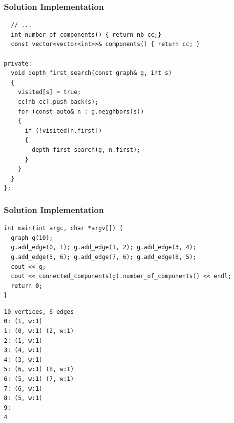 \documentclass{beamer}
\begin{document}
\begin{frame}[containsverbatim]
\frametitle{Solution Implementation}

\scriptsize
\begin{lstlisting}
  // ...
  int number_of_components() { return nb_cc;}
  const vector<vector<int>>& components() { return cc; }

private:
  void depth_first_search(const graph& g, int s)
  {
    visited[s] = true;
    cc[nb_cc].push_back(s);
    for (const auto& n : g.neighbors(s))
    {
      if (!visited[n.first])
      {
        depth_first_search(g, n.first);
      }
    }
  }
};
\end{lstlisting}

\end{frame}

\begin{frame}[containsverbatim]
\frametitle{Solution Implementation}

\tiny
\begin{lstlisting}
int main(int argc, char *argv[]) {
  graph g(10);
  g.add_edge(0, 1); g.add_edge(1, 2); g.add_edge(3, 4);
  g.add_edge(5, 6); g.add_edge(7, 6); g.add_edge(8, 5);
  cout << g;
  cout << connected_components(g).number_of_components() << endl;
  return 0;
}
\end{lstlisting}
\scriptsize
\begin{verbatim}
10 vertices, 6 edges
0: (1, w:1)
1: (0, w:1) (2, w:1)
2: (1, w:1)
3: (4, w:1)
4: (3, w:1)
5: (6, w:1) (8, w:1)
6: (5, w:1) (7, w:1)
7: (6, w:1)
8: (5, w:1)
9:
4
\end{verbatim}

\end{frame}

\fi
\end{document}
